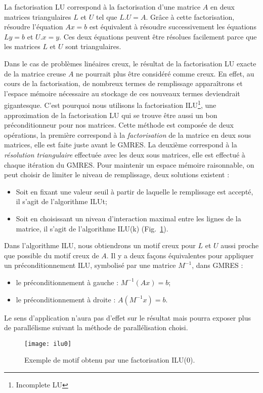La factorisation LU correspond à la factorisation d'une matrice $A$ en deux matrices triangulaires $L$ et $U$ tel que $L.U=A$.
%
Grâce à cette factorisation, résoudre l'équation $Ax=b$ est équivalent à résoudre successivement les équations $Ly=b$ et $U.x=y$.
%
Ces deux équations peuvent être résolues facilement parce que les matrices $L$ et $U$ sont triangulaires.


Dans le cas de problèmes linéaires creux, le résultat de la factorisation LU exacte de la matrice creuse $A$ ne pourrait plus être considéré comme creux.
%
En effet, au cours de la factorisation, de nombreux termes de remplissage apparaîtrons et l'espace mémoire nécessaire au stockage de ces nouveaux termes deviendrait gigantesque.
%
C'est pourquoi nous utilisons la factorisation ILU\footnote{Incomplete LU}, une approximation de la factorisation LU qui se trouve être aussi un bon préconditionneur pour nos matrices.
%
Cette méthode est composée de deux opérations, la première correspond à la {\em factorisation} de la matrice en deux sous matrices, elle est faite juste avant le GMRES.
%
La deuxième correspond à la {\em résolution triangulaire} effectuée avec les deux sous matrices, elle est effectué à chaque itération du GMRES.
%
Pour maintenir un espace mémoire raisonnable, on peut choisir de limiter le niveau de remplissage, deux solutions existent :
\begin{itemize}
  \item Soit en fixant une valeur seuil à partir de laquelle le remplissage est accepté, il s'agit de l'algorithme ILUt;
%
  \item Soit en choisissant un niveau d'interaction maximal entre les lignes de la matrice, il s'agit de l'algorithme ILU(k) (Fig.~\ref{fig:ilu0}).
\end{itemize}
%
Dans l'algorithme ILU, nous obtiendrons un motif creux pour $L$ et $U$ aussi proche que possible du motif creux de $A$.
%
Il y a deux façons équivalentes pour appliquer un préconditionnement ILU, symbolisé par une matrice $M^{-1}$, dans GMRES :
\begin{itemize}
  \item le préconditionnement à gauche : $M^{-1}(Ax)=b$;
  \item le préconditionnement à droite : $A(M^{-1}x)=b$.
\end{itemize}
%
Le sens d'application n'aura pas d'effet sur le résultat mais pourra exposer plus de parallélisme suivant la méthode de parallélisation choisi.


\begin{figure}[t!]
  \centering
  \texttt{[image: ilu0]}
  \caption{Exemple de motif obtenu par une factorisation ILU(0).}
  \label{fig:ilu0}
\end{figure}
